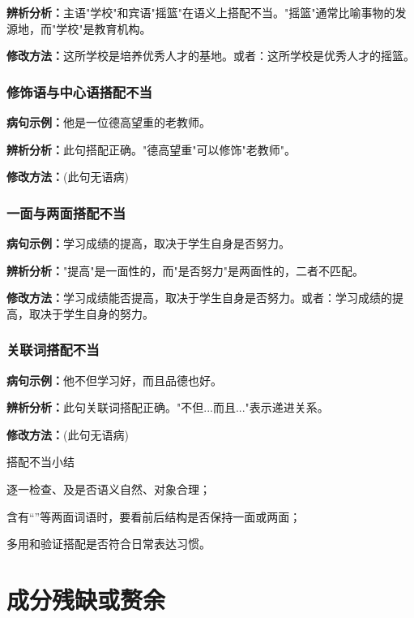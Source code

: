 \documentclass[a4paper,12pt]{ctexrep}
\newcommand{\exampleicon}{\textcolor{highlight}{\faExclamationTriangle}}
\newcommand{\analysisicon}{\textcolor{accent}{\faSearch}}
\newcommand{\revisionicon}{\textcolor{secondary}{\faCheckCircle}}
\begin{document}
\analysisicon \textbf{辨析分析：}主语"学校"和宾语"摇篮"在语义上搭配不当。"摇篮"通常比喻事物的发源地，而"学校"是教育机构。

\revisionicon \textbf{修改方法：}这所学校是培养优秀人才的基地。或者：这所学校是优秀人才的摇篮。

\subsection{修饰语与中心语搭配不当}
\exampleicon \textbf{病句示例：}他是一位德高望重的老教师。

\analysisicon \textbf{辨析分析：}此句搭配正确。"德高望重"可以修饰"老教师"。

\revisionicon \textbf{修改方法：}(此句无语病)

\subsection{一面与两面搭配不当}
\exampleicon \textbf{病句示例：}学习成绩的提高，取决于学生自身是否努力。

\analysisicon \textbf{辨析分析：}"提高"是一面性的，而"是否努力"是两面性的，二者不匹配。

\revisionicon \textbf{修改方法：}学习成绩能否提高，取决于学生自身是否努力。或者：学习成绩的提高，取决于学生自身的努力。

\subsection{关联词搭配不当}
\exampleicon \textbf{病句示例：}他不但学习好，而且品德也好。

\analysisicon \textbf{辨析分析：}此句关联词搭配正确。"不但...而且..."表示递进关系。

\revisionicon \textbf{修改方法：}(此句无语病)

\begin{summarybox}{搭配不当小结}
\begin{focuspoints}
  \item 逐一检查、及是否语义自然、对象合理；
  \item 含有“”等两面词语时，要看前后结构是否保持一面或两面；
  \item 多用和验证搭配是否符合日常表达习惯。
\end{focuspoints}
\end{summarybox}

\chapter{成分残缺或赘余}
\end{document}
